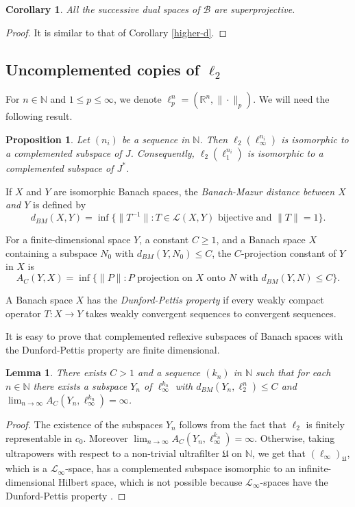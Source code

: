 \documentclass[12pt]{amsart}
\theoremstyle{plain}
\numberwithin{equation}{section}
\newcommand{\N}{\mathbb{N}}
\newcommand{\R}{\mathbb{R}}
\newcommand{\U}{\mathfrak{U}}
\newcommand{\B}{\mathcal{B}}
\newcommand{\Lc}{\mathcal{L}}
\newtheorem{lemma}[theorem]{Lemma}
\newtheorem{proposition}[theorem]{Proposition}
\newtheorem{corollary}[theorem]{Corollary}
\begin{document}
\begin{corollary}
All the successive dual spaces of $\B$ are superprojective.
\end{corollary}
\begin{proof}
It is similar to that of Corollary \ref{higher-d}.
\end{proof}

\subsection{Uncomplemented copies of $\ell_2$}\label{sect:uncompl}

For $n\in\N$ and $1\leq p\leq\infty$, we denote $\ell_p^n =(\R^n,\|\cdot\|_p)$. We will need the following result.

\begin{proposition}\label{prop:FG} \emph{\cite[Theorem 2.d.6]{FetterG}}
Let $(n_i)$ be a sequence in $\N$. Then $\ell_2( \ell_\infty^{n_i})$ is isomorphic to a complemented subspace of $J$.
Consequently, $\ell_2(\ell_1^{n_i})$ is isomorphic to a complemented subspace of $J^*$.
\end{proposition}

If $X$ and $Y$ are isomorphic Banach spaces, the \emph{Banach-Mazur distance between $X$ and $Y$} is defined by
$$
d_{BM}(X,Y) = \inf\{\|T^{-1}\| : T\in \Lc(X,Y)  \textrm{ bijective and }\|T\|=1\}.
$$

For a finite-dimensional space $Y$, a constant $C\geq 1$, and a Banach space $X$ containing a subspace $N_0$
with $d_{BM}(Y,N_0) \leq C$, the $C$-projection constant of $Y$ in $X$ is
$$
A_C(Y,X)=\inf\{\|P\|: P \textrm{ projection on $X$ onto $N$ with }d_{BM}(Y,N) \leq C\}.
$$

A Banach space $X$ has the \emph{Dunford-Pettis property} if every weakly compact operator $T:X\to Y$ takes weakly convergent
sequences to convergent sequences.

It is easy to prove that complemented reflexive subspaces of Banach spaces with the Dunford-Pettis property
are finite dimensional.

\begin{lemma}\label{l2-linfty}
There exists $C>1$ and a sequence $(k_n)$ in $\N$ such that for each $n\in \N$ there exists a subspace $Y_n$ of $\ell_\infty^{k_n}$ with
$d_{BM}(Y_n,\ell_2^n)\leq C$ and $\lim_{n\to\infty} A_C(Y_n,\ell_\infty^{k_n}) =\infty$.
\end{lemma}
\begin{proof}
The existence of the subspaces $Y_n$ follows from the fact that $\ell_2$ is finitely representable in $c_0$.
Moreover $\lim_{n\to\infty} A_C(Y_n, \ell_\infty^{k_n}) =\infty$. Otherwise, taking ultrapowers with respect to a non-trivial ultrafilter $\U$ on $\N$,
we get that $(\ell_\infty)_\U$, which is a $\Lc_\infty$-space, has a complemented subspace isomorphic to an infinite-dimensional Hilbert space,
which is not possible because $\Lc_\infty$-spaces have the Dunford-Pettis property \cite[Chapter 1]{Bo:81}.
\end{proof}
\end{document}
